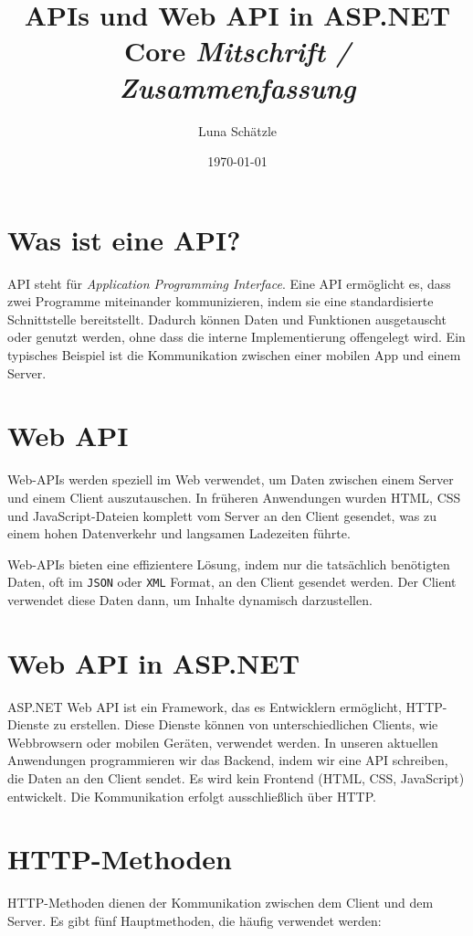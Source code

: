 \documentclass[a4paper,12pt]{report}
\title{
    \vspace{2cm}
    \Huge \textbf{APIs und Web API in ASP.NET Core}
    \vspace{0.5cm}
    \Large \textit{Mitschrift / Zusammenfassung}
    \vspace{2cm}
}
\author{Luna Schätzle}
\date{\today}
\begin{document}
\maketitle

\tableofcontents
\newpage

\section{Was ist eine API?}
API steht für \textit{Application Programming Interface}. Eine API ermöglicht es, dass zwei Programme miteinander kommunizieren, indem sie eine standardisierte Schnittstelle bereitstellt. Dadurch können Daten und Funktionen ausgetauscht oder genutzt werden, ohne dass die interne Implementierung offengelegt wird. Ein typisches Beispiel ist die Kommunikation zwischen einer mobilen App und einem Server.

\section{Web API}
Web-APIs werden speziell im Web verwendet, um Daten zwischen einem Server und einem Client auszutauschen. In früheren Anwendungen wurden HTML, CSS und JavaScript-Dateien komplett vom Server an den Client gesendet, was zu einem hohen Datenverkehr und langsamen Ladezeiten führte. 

Web-APIs bieten eine effizientere Lösung, indem nur die tatsächlich benötigten Daten, oft im \texttt{JSON} oder \texttt{XML} Format, an den Client gesendet werden. Der Client verwendet diese Daten dann, um Inhalte dynamisch darzustellen.

\section{Web API in ASP.NET}
ASP.NET Web API ist ein Framework, das es Entwicklern ermöglicht, HTTP-Dienste zu erstellen. Diese Dienste können von unterschiedlichen Clients, wie Webbrowsern oder mobilen Geräten, verwendet werden. In unseren aktuellen Anwendungen programmieren wir das Backend, indem wir eine API schreiben, die Daten an den Client sendet. Es wird kein Frontend (HTML, CSS, JavaScript) entwickelt. Die Kommunikation erfolgt ausschließlich über HTTP.

\section{HTTP-Methoden}
HTTP-Methoden dienen der Kommunikation zwischen dem Client und dem Server. Es gibt fünf Hauptmethoden, die häufig verwendet werden:
\end{document}
